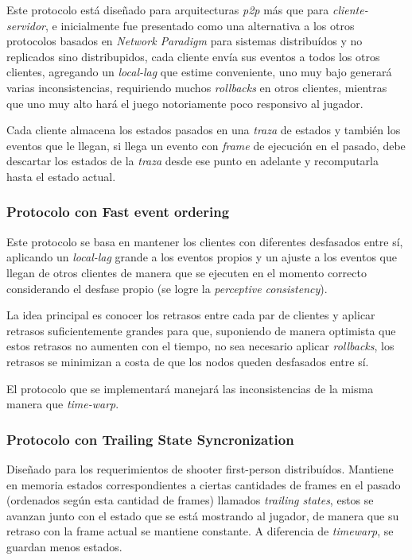 Este protocolo está diseñado para arquitecturas \emph{p2p} más que para \emph{cliente-servidor}, e inicialmente fue presentado como una alternativa a los otros protocolos basados en \emph{Network Paradigm} para sistemas distribuídos y no replicados sino distribupidos, cada cliente envía sus eventos a todos los otros clientes, agregando un \emph{local-lag} que estime conveniente, uno muy bajo generará varias inconsistencias, requiriendo muchos \emph{rollbacks} en otros clientes, mientras que uno muy alto hará el juego notoriamente poco responsivo al jugador.

Cada cliente almacena los estados pasados en una \emph{traza} de estados y también los eventos que le llegan, si llega un evento con \emph{frame} de ejecución en el pasado, debe descartar los estados de la \emph{traza} desde ese punto en adelante y recomputarla hasta el estado actual.

\subsubsection{Protocolo con Fast event ordering}

Este protocolo se basa en mantener los clientes con diferentes desfasados entre sí, aplicando un \emph{local-lag} grande a los eventos propios y un ajuste a los eventos que llegan de otros clientes de manera que se ejecuten en el momento correcto considerando el desfase propio (se logre la \emph{perceptive consistency}).

La idea principal es conocer los retrasos entre cada par de clientes y aplicar retrasos suficientemente grandes para que, suponiendo de manera optimista que estos retrasos no aumenten con el tiempo, no sea necesario aplicar \emph{rollbacks}, los retrasos se minimizan a costa de que los nodos queden desfasados entre sí.

El protocolo que se implementará manejará las inconsistencias de la misma manera que \emph{time-warp}.


\subsubsection{Protocolo con Trailing State Syncronization}

Diseñado para los requerimientos de shooter first-person distribuídos. Mantiene en memoria estados correspondientes a ciertas cantidades de frames en el pasado (ordenados según esta cantidad de frames) llamados \emph{trailing states}, estos se avanzan junto con el estado que se está mostrando al jugador, de manera que su retraso con la frame actual se mantiene constante. A diferencia de \emph{timewarp}, se guardan menos estados.

